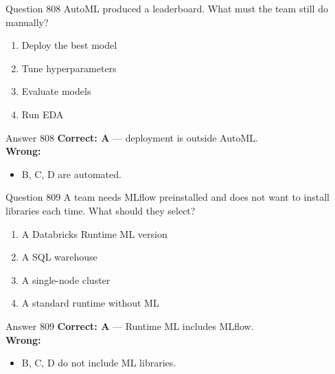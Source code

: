 \documentclass[aspectratio=169,11pt]{beamer}
\begin{document}
	\begin{frame}{Question 808}
		AutoML produced a leaderboard. What must the team still do manually?
		\begin{enumerate}[label=\Alph*.]
			\item Deploy the best model
			\item Tune hyperparameters
			\item Evaluate models
			\item Run EDA
		\end{enumerate}
	\end{frame}
	\begin{frame}{Answer 808}
		\textbf{Correct: A} --- deployment is outside AutoML.\\
		\vspace{0.5em}
		\textbf{Wrong:}
		\begin{itemize}
			\item B, C, D are automated.
		\end{itemize}
	\end{frame}
	
	\begin{frame}{Question 809}
		A team needs MLflow preinstalled and does not want to install libraries each time. What should they select?
		\begin{enumerate}[label=\Alph*.]
			\item A Databricks Runtime ML version
			\item A SQL warehouse
			\item A single-node cluster
			\item A standard runtime without ML
		\end{enumerate}
	\end{frame}
	\begin{frame}{Answer 809}
		\textbf{Correct: A} --- Runtime ML includes MLflow.\\
		\vspace{0.5em}
		\textbf{Wrong:}
		\begin{itemize}
			\item B, C, D do not include ML libraries.
		\end{itemize}
	\end{frame}
	
\end{document}
